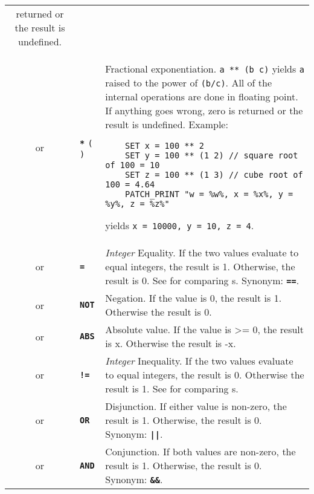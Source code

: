 \documentclass{article}
\def\ttref#1{\ahrefloc{#1}{\tt #1}}
\def\DEFINE#1{{\tt \bf #1}\label{#1}\index{#1}}
\def\DEFSYN#1{{\tt \bf #1}\index{#1}}
\def\t#1{{\tt #1}}
\def\textexcl{!}
\def\textpipe{|}
\begin{document}
\begin{tabular}{cp{10in}|p{10in}}
returned or the result is undefined. \\
or & \ttref{value} \DEFSYN{**} \t{(} \ttref{value} \ttref{value} \t{)} &
  Fractional exponentiation. \t{a ** (b c)} yields \t{a} raised to the 
  power of \t{(b/c)}. All of the internal operations are done in floating
  point. If anything goes wrong, zero is returned or the result is
  undefined. Example: 
  \begin{verbatim}
    SET x = 100 ** 2            
    SET y = 100 ** (1 2) // square root of 100 = 10
    SET z = 100 ** (1 3) // cube root of 100 = 4.64 
    PATCH_PRINT "w = %w%, x = %x%, y = %y%, z = %z%"
  \end{verbatim}
  yields \t{x = 10000, y = 10, z = 4}.  \\

or & \ttref{value} \DEFINE{=} \ttref{value} & \emph{Integer} Equality. If the two
values evaluate to equal integers, the result is 1. Otherwise, the result
is 0. See \ttref{STRING!COMPARE} for comparing \ttref{String}s. Synonym:
\DEFSYN{==}. 
\\
or & \DEFINE{NOT} \ttref{value} & Negation. If the value is 0, the result is 1.
Otherwise the result is 0. \\
or & \DEFINE{ABS} \ttref{Value} & Absolute value. If the value is >= 0, the result
is x. Otherwise the result is -x. \\
or & \ttref{value} \DEFINE{\textexcl=} \ttref{value} & \emph{Integer} Inequality. If
the two values evaluate to equal integers, the result is 0. Otherwise the
result is 1. See \ttref{STRING!COMPARE} for comparing \ttref{String}s. \\
or & \ttref{value} \DEFINE{OR} \ttref{value} & Disjunction. If either value is
non-zero, the result is 1. Otherwise, the result is 0. Synonym: \DEFSYN{\textpipe\textpipe}. \\
or & \ttref{value} \DEFINE{AND} \ttref{value} & Conjunction. If both values are
non-zero, the result is 1. Otherwise, the result is 0. Synonym: \DEFSYN{\&\&}. \\


\end{tabular}
\end{document}
